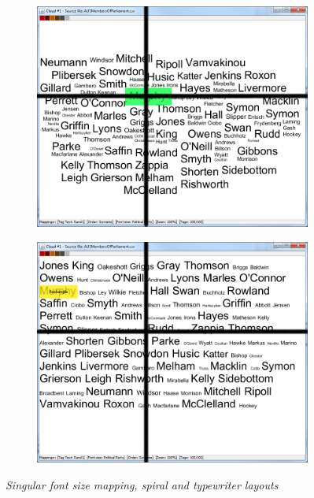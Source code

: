 \begin{figure}[!htb]
\centering
\begin{subfigure}{.5\textwidth}
  \centering
  \includegraphics[scale=0.25]{M1Spiralfixation.png}
  \caption{}
\end{subfigure}%
\begin{subfigure}{.5\textwidth}
  \centering
  \includegraphics[scale=0.25]{M1Typewriterfixation.png}
  \caption{}
\end{subfigure}
\caption{\textit{Singular font size mapping, spiral and typewriter layouts}}
\label{fig:fixationdata}
\end{figure}

